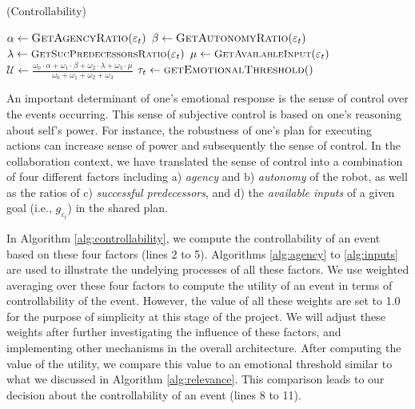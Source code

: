 \documentclass[letterpaper]{article}
\begin{document}
\begin{algorithm}
	\caption{(Controllability)}
	\label{alg:controllability}
	\begin{algorithmic}[1]
			\Statex
			\State $\alpha \gets \Call{GetAgencyRatio}{\varepsilon_t}$ 
			\State $\beta \gets \Call{GetAutonomyRatio}{\varepsilon_t}$
			\Statex
			\State $\lambda \gets
			\Call{\small{GetSucPredecessorsRatio}}{\varepsilon_t}$
			\State $\mu \gets
			\Call{\small{GetAvailableInput}}{\varepsilon_t}$
			\Statex
			\State $\mathcal{U} \gets
			\frac{\omega_{0}\cdot \alpha + \omega_{1}\cdot \beta + \omega_{2}\cdot
			\lambda + \omega_{3}\cdot \mu}{\omega_{0} + \omega_{1} + \omega_{2} +
			\omega_{3}}$
			\Statex
			\State $\tau_{t} \gets \Call{getEmotionalThreshold}{ }$
			\Statex
				\State {}
			\Else
				\State {}
			\EndIf
		\EndFunction
	\end{algorithmic}
\end{algorithm}

An important determinant of one's emotional response is the sense of control
over the events occurring. This sense of subjective control is based on one's
reasoning about self's power. For instance, the robustness of one's plan for
executing actions can increase sense of power and subsequently the sense of
control. In the collaboration context, we have translated the sense of control
into a combination of four different factors including a) \textit{agency} and b)
\textit{autonomy} of the robot, as well as the ratios of c) \textit{successful
predecessors}, and d) the \textit{available inputs} of a given goal
(i.e., $\mathit{g}_{\varepsilon_t}$) in the shared plan. 

In Algorithm \ref{alg:controllability}, we compute the controllability of an
event based on these four factors (lines 2 to 5). Algorithms \ref{alg:agency} to
\ref{alg:inputs} are used to illustrate the undelying processes of all these
factors. We use weighted averaging over these four factors to compute the
utility of an event in terms of controllability of the event. However, the
value of all these weights are set to 1.0 for the purpose of simplicity at
this stage of the project. We will adjust these weights after further
investigating the influence of these factors, and implementing other mechanisms
in the overall architecture. After computing the value of the utility, we
compare this value to an emotional threshold similar to what we discussed in
Algorithm \ref{alg:relevance}. This comparison leads to our decision about the
controllability of an event (lines 8 to 11).
\end{document}
